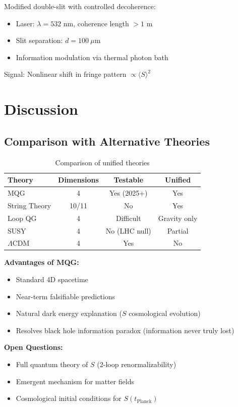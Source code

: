 \documentclass[twocolumn,prd,superscriptaddress,nofootinbib]{revtex4-2}
\newcommand{\sfield}{S}
\begin{document}
Modified double-slit with controlled decoherence:
\begin{itemize}
\item Laser: $\lambda = 532$ nm, coherence length $> 1$ m
\item Slit separation: $d = 100~\mu$m
\item Information modulation via thermal photon bath
\end{itemize}

Signal: Nonlinear shift in fringe pattern $\propto \langle \sfield \rangle^2$

\section{Discussion}

\subsection{Comparison with Alternative Theories}

\begin{table}[h]
\centering
\begin{tabular}{lccc}
\hline\hline
Theory & Dimensions & Testable & Unified \\
\hline
MQG & 4 & Yes (2025+) & Yes \\
String Theory & 10/11 & No & Yes \\
Loop QG & 4 & Difficult & Gravity only \\
SUSY & 4 & No (LHC null) & Partial \\
$\Lambda$CDM & 4 & Yes & No \\
\hline\hline
\end{tabular}
\caption{Comparison of unified theories}
\end{table}

\textbf{Advantages of MQG:}
\begin{itemize}
\item Standard 4D spacetime
\item Near-term falsifiable predictions
\item Natural dark energy explanation ($\sfield$ cosmological evolution)
\item Resolves black hole information paradox (information never truly lost)
\end{itemize}

\textbf{Open Questions:}
\begin{itemize}
\item Full quantum theory of $\sfield$ (2-loop renormalizability)
\item Emergent mechanism for matter fields
\item Cosmological initial conditions for $\sfield(t_{\text{Planck}})$
\end{itemize}
\end{document}
